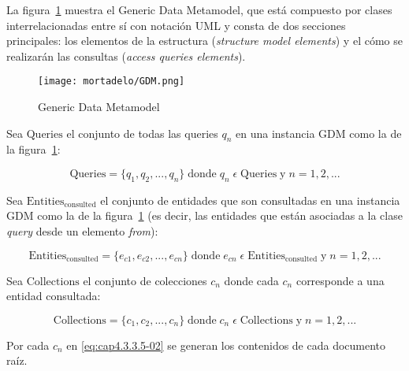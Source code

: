 La figura~\ref{img:mortadelo-gdm1} muestra el Generic Data Metamodel, que está compuesto por clases interrelacionadas entre sí con notación UML y consta de dos secciones principales: los elementos de la estructura (\textit{structure model elements}) y el cómo se realizarán las consultas (\textit{access queries elements}).


\begin{figure}[H] 
    \centering
    \texttt{[image: mortadelo/GDM.png]}
    \caption{Generic Data Metamodel}
    \label{img:mortadelo-gdm1}
\end{figure}



Sea $\mathrm{Queries}$ el conjunto de todas las queries $q_{n}$ en una instancia GDM como la de la figura~\ref{img:mortadelo-gdm1}:

\begin{equation} \label{eq:cap4.3.3.5-00}
    \mathrm{Queries} = \{q_{1}, q_{2},..., q_{n}\}\; \mathrm{donde}\; q_{n}\;\epsilon\;\mathrm{Queries}\; \mathrm{y}\; n=1,2,...
\end{equation}


Sea $\mathrm{Entities_{consulted}}$ el conjunto de entidades que son consultadas en una instancia GDM como la de la figura~\ref{img:mortadelo-gdm1} (es decir, las entidades que están asociadas a la clase \textit{query} desde un elemento \textit{from}): 


\begin{equation} \label{eq:cap4.3.3.5-01}
    \mathrm{Entities_{consulted}} = \{e_{c1},e_{c2},...,e_{cn}\}\; \mathrm{donde}\; e_{cn}\;\epsilon\;\mathrm{Entities_{consulted}}\; \mathrm{y}\; n=1,2,...
\end{equation}

Sea $\mathrm{Collections}$ el conjunto de colecciones $c_{n}$ donde cada $c_{n}$ corresponde a una entidad consultada:

\begin{equation} \label{eq:cap4.3.3.5-02}
    \mathrm{Collections} = \{c_{1},c_{2},...,c_{n}\}\; \mathrm{donde}\; c_{n}\;\epsilon\;\mathrm{Collections}\; \mathrm{y}\; n=1,2,...
\end{equation}




Por cada $c_{n}$ en \eqref{eq:cap4.3.3.5-02} se generan los contenidos de cada documento raíz.


